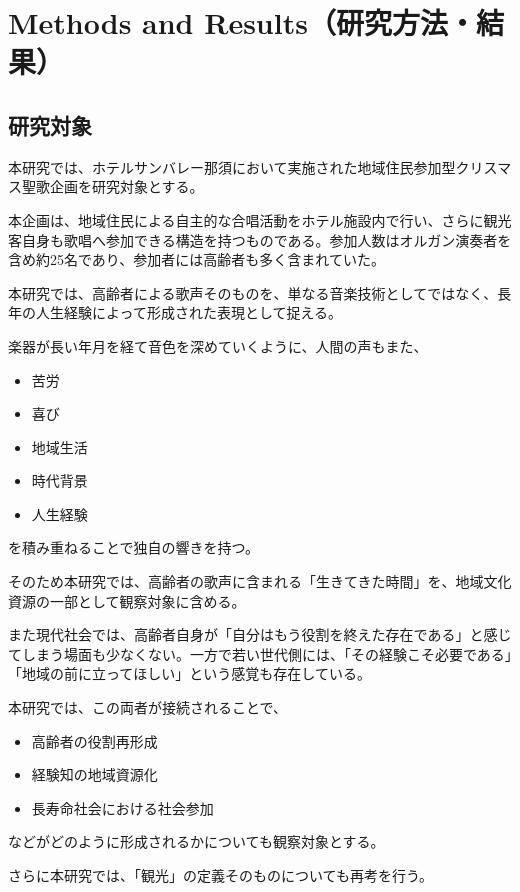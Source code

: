 \section{Methods and Results（研究方法・結果）}

\subsection{研究対象}

本研究では、ホテルサンバレー那須において実施された地域住民参加型クリスマス聖歌企画を研究対象とする。

本企画は、地域住民による自主的な合唱活動をホテル施設内で行い、さらに観光客自身も歌唱へ参加できる構造を持つものである。参加人数はオルガン演奏者を含め約25名であり、参加者には高齢者も多く含まれていた。

本研究では、高齢者による歌声そのものを、単なる音楽技術としてではなく、長年の人生経験によって形成された表現として捉える。

楽器が長い年月を経て音色を深めていくように、人間の声もまた、

\begin{itemize}
\item 苦労
\item 喜び
\item 地域生活
\item 時代背景
\item 人生経験
\end{itemize}

を積み重ねることで独自の響きを持つ。

そのため本研究では、高齢者の歌声に含まれる「生きてきた時間」を、地域文化資源の一部として観察対象に含める。

また現代社会では、高齢者自身が「自分はもう役割を終えた存在である」と感じてしまう場面も少なくない。一方で若い世代側には、「その経験こそ必要である」「地域の前に立ってほしい」という感覚も存在している。

本研究では、この両者が接続されることで、

\begin{itemize}
\item 高齢者の役割再形成
\item 経験知の地域資源化
\item 長寿命社会における社会参加
\end{itemize}

などがどのように形成されるかについても観察対象とする。

さらに本研究では、「観光」の定義そのものについても再考を行う。

